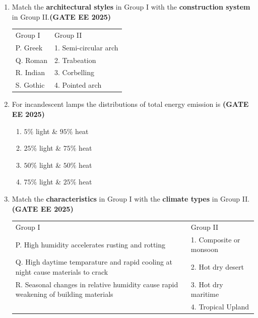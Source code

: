 \documentclass[journal,12pt,onecolumn]{IEEEtran}
\theoremstyle{remark}
\begin{document}
\begin{enumerate}
\item Match the \textbf{architectural styles} in Group I with the \textbf{construction system} in Group II.\hfill \textbf{(GATE EE 2025)}
\newline
\begin{tabular}{p{}p{}}
Group I & Group II\\
P. Greek     & 1. Semi-circular arch \\
Q. Roman     & 2. Trabeation\\
R. Indian  & 3. Corbelling\\
S. Gothic  & 4. Pointed arch\\
\end{tabular}
\begin{enumerate}
\end{enumerate}
\item For incandescent lamps the distributions of total energy emission is \hfill \textbf{(GATE EE 2025)}
\begin{enumerate}
    \item $5\%$ light \& $95\%$ heat
    \item $25\%$ light \& $75\%$ heat
    \item $50\%$ light \& $50\%$ heat
    \item $75\%$ light \& $25\%$ heat
\end{enumerate}
\item Match the \textbf{characteristics} in Group I with the \textbf{climate types} in Group II.\hfill \textbf{(GATE EE 2025)}
\newline
\begin{tabular}{p{}p{}}
Group I     & Group II \\
P. High humidity accelerates rusting and rotting     & 1. Composite or monsoon\\
Q. High daytime temparature and rapid cooling at night cause materials to crack & 2. Hot dry desert\\
R. Seasonal changes in relative humidity cause rapid weakening of building materials & 3. Hot dry maritime\\
  & 4. Tropical Upland\\

\end{tabular}
\end{enumerate}
\end{document}

